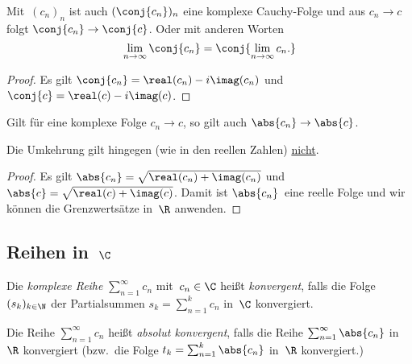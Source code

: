 \documentclass[a4paper]{article}
\begin{document}
\begin{corollary}\label{cor:complex:sequence:conjugate}
    Mit~$(c_n)_n$ ist auch $(\conj{c_n})_n$ eine komplexe Cauchy-Folge und aus $c_n \to c$ folgt $\conj{c_n} \to \conj{c}$. Oder mit anderen Worten
    \begin{equation*}
        \lim_{n\to\infty} \conj{c_n} = \conj{\lim_{n\to\infty} c_n.}
    \end{equation*}
\end{corollary}

\begin{proof}
    Es gilt $\conj{c_n} = \real(c_n)-i\imag(c_n)$ und $\conj{c} = \real(c)-i\imag(c)$.
\end{proof}

\begin{corollary}
    Gilt für eine komplexe Folge $c_n \to c$, so gilt auch $\abs{c_n} \to \abs{c}$.
\end{corollary}

Die Umkehrung gilt hingegen (wie in den reellen Zahlen) \underline{nicht}.

\begin{proof}
    Es gilt $\abs{c_n} = \sqrt{\real(c_n)+\imag(c_n)}$ und $\abs{c} = \sqrt{\real(c)+\imag(c)}$. Damit ist $\abs{c_n}$~eine reelle Folge und wir können die Grenzwertsätze in~$\R$ anwenden.
\end{proof}

\subsection{Reihen in~\texorpdfstring{$\C$}{C}}

\begin{definition}
    Die \emph{komplexe Reihe} $\sum_{n=1}^\infty c_n$ mit~$c_n \in \C$ heißt \emph{konvergent}, falls die Folge $(s_k)_{k\in\N}$ der Partialsummen $s_k = \sum_{n=1}^k c_n$ in~$\C$ konvergiert.

    Die Reihe $\sum_{n=1}^\infty c_n$ heißt \emph{absolut konvergent}, falls die Reihe $\sum_{n=1}^\infty \abs{c_n}$ in~$\R$ konvergiert (bzw.\ die Folge $t_k = \sum_{n=1}^k \abs{c_n}$ in~$\R$ konvergiert.)
\end{definition}
\end{document}
